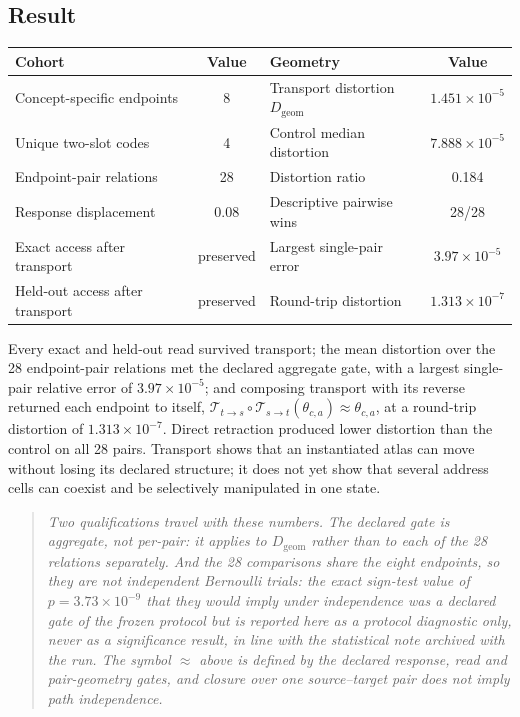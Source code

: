 \documentclass[11pt]{article}
\newenvironment{scopebox}{\begin{quote}\small\itshape}{\end{quote}}
\begin{document}
\subsection{Result}

\begin{center}\small
\begin{tabular}{lc@{\qquad}lc}
\toprule
Cohort & Value & Geometry & Value \\
\midrule
Concept-specific endpoints & 8 & Transport distortion $D_{\mathrm{geom}}$ & $1.451\times10^{-5}$ \\
Unique two-slot codes & 4 & Control median distortion & $7.888\times10^{-5}$ \\
Endpoint-pair relations & 28 & Distortion ratio & 0.184 \\
Response displacement & 0.08 & Descriptive pairwise wins & 28/28 \\
Exact access after transport & preserved & Largest single-pair error & $3.97\times10^{-5}$ \\
Held-out access after transport & preserved & Round-trip distortion & $1.313\times10^{-7}$ \\
\bottomrule
\end{tabular}
\end{center}

Every exact and held-out read survived transport; the mean distortion over the 28 endpoint-pair relations met
the declared aggregate gate, with a largest single-pair relative error of $3.97\times10^{-5}$; and composing
transport with its reverse returned each endpoint to itself,
$\mathcal{T}_{t\to s}\circ\mathcal{T}_{s\to t}(\theta_{c,a})\approx\theta_{c,a}$, at a round-trip distortion of
$1.313\times10^{-7}$. Direct retraction produced lower distortion than the control on all 28 pairs. Transport
shows that an instantiated atlas can move without losing its declared structure; it does not yet show that
several address cells can coexist and be selectively manipulated in one state.

\begin{scopebox}
Two qualifications travel with these numbers. The declared gate is aggregate, not per-pair: it applies to
$D_{\mathrm{geom}}$ rather than to each of the 28 relations separately. And the 28 comparisons share the eight endpoints, so they are not independent
Bernoulli trials: the exact sign-test value of $p=3.73\times10^{-9}$ that they would imply under independence
was a declared gate of the frozen protocol but is reported here as a protocol diagnostic only, never as a
significance result, in line with the statistical note archived with the run. The symbol $\approx$ above is
defined by the declared response, read and pair-geometry gates, and closure over one source--target pair does
not imply path independence.
\end{scopebox}
\end{document}
